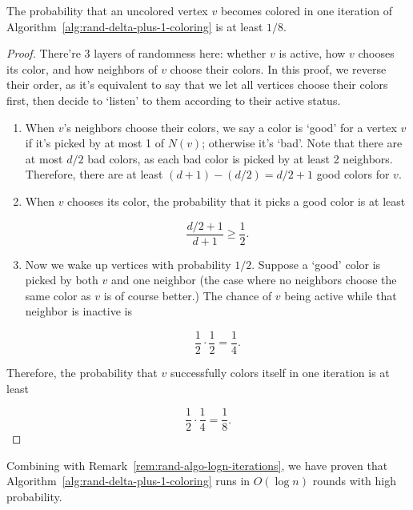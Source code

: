 \begin{theorem}
  The probability that an uncolored vertex $v$ becomes colored in one iteration of Algorithm~\ref{alg:rand-delta-plus-1-coloring} is at least $1/8$.
\end{theorem}
\begin{proof}
There're 3 layers of randomness here: whether $v$ is active, how $v$ chooses its color, and how neighbors of $v$ choose their colors. In this proof, we reverse their order, as it's equivalent to say that we let all vertices choose their colors first, then decide to `listen' to them according to their active status.

\begin{enumerate}
  \item When $v$'s neighbors choose their colors, we say a color is `good' for a vertex $v$ if it's picked by at most 1 of $N(v)$; otherwise it's `bad'. Note that there are at most $d/2$ bad colors, as each bad color is picked by at least 2 neighbors. Therefore, there are at least $(d+1) - (d/2) = d/2 + 1$ good colors for $v$.
  \item When $v$ chooses its color, the probability that it picks a good color is at least

    \[
      \frac{d/2 + 1}{d + 1} \geq \frac{1}{2}.
    \]
  \item Now we wake up vertices with probability $1/2$.
    Suppose a `good' color is picked by both $v$ and one neighbor (the case where no neighbors choose the same color as $v$ is of course better.) The chance of $v$ being active while that neighbor is inactive is

    \[
      \frac{1}{2} \cdot \frac{1}{2} = \frac{1}{4}.
    \]
\end{enumerate}

    Therefore, the probability that $v$ successfully colors itself in one iteration is at least

    \[
      \frac{1}{2} \cdot \frac{1}{4} = \frac{1}{8}.
    \]
\end{proof}

Combining with Remark~\ref{rem:rand-algo-logn-iterations}, we have proven that Algorithm~\ref{alg:rand-delta-plus-1-coloring} runs in $O(\log n)$ rounds with high probability.
